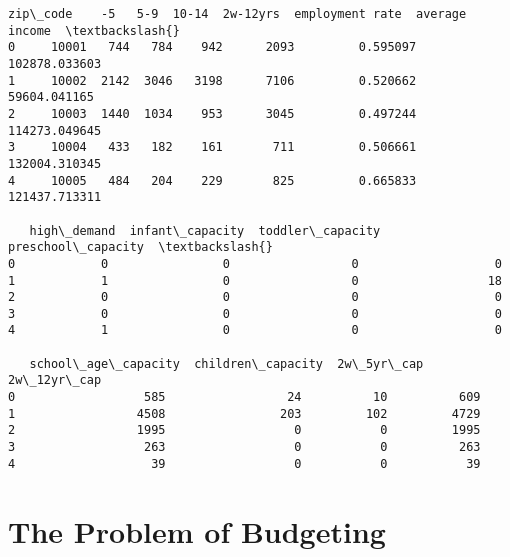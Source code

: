 \documentclass[11pt]{article}
\makeatletter
\newcommand{\boxspacing}{\kern\kvtcb@left@rule\kern\kvtcb@boxsep}
\newcommand{\prompt}[4]{
        {\ttfamily\llap{{\color{#2}[#3]:\hspace{3pt}#4}}\vspace{-\baselineskip}}
    }
\makeatother
\begin{document}
            \begin{tcolorbox}[breakable, size=fbox, boxrule=.5pt, pad at break*=1mm, opacityfill=0]
\prompt{Out}{outcolor}{20}{\boxspacing}
\begin{Verbatim}[commandchars=\\\{\}]
   zip\_code    -5   5-9  10-14  2w-12yrs  employment rate  average income  \textbackslash{}
0     10001   744   784    942      2093         0.595097   102878.033603
1     10002  2142  3046   3198      7106         0.520662    59604.041165
2     10003  1440  1034    953      3045         0.497244   114273.049645
3     10004   433   182    161       711         0.506661   132004.310345
4     10005   484   204    229       825         0.665833   121437.713311

   high\_demand  infant\_capacity  toddler\_capacity  preschool\_capacity  \textbackslash{}
0            0                0                 0                   0
1            1                0                 0                  18
2            0                0                 0                   0
3            0                0                 0                   0
4            1                0                 0                   0

   school\_age\_capacity  children\_capacity  2w\_5yr\_cap  2w\_12yr\_cap
0                  585                 24          10          609
1                 4508                203         102         4729
2                 1995                  0           0         1995
3                  263                  0           0          263
4                   39                  0           0           39
\end{Verbatim}
\end{tcolorbox}
        
    \hypertarget{the-problem-of-budgeting}{%
\section{The Problem of Budgeting}\label{the-problem-of-budgeting}}
\end{document}
